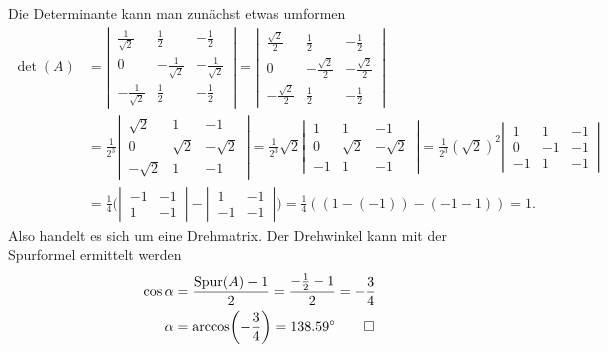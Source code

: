 \begin{loesung}
Die Determinante kann man zunächst etwas umformen
\begin{align*}
\det(A)
&=
\left|\,\begin{matrix}
\frac1{\sqrt{2}}&\frac12&-\frac12\\
0&-\frac1{\sqrt{2}}&-\frac1{\sqrt{2}}\\
-\frac1{\sqrt{2}}&\frac12&-\frac12
\end{matrix}\,\right|
=
\left|\,\begin{matrix}
\frac{\sqrt{2}}2&\frac12&-\frac12\\
0&-\frac{\sqrt{2}}2&-\frac{\sqrt{2}}2\\
-\frac{\sqrt{2}}2&\frac12&-\frac12
\end{matrix}\,\right|
\\
&=
\frac1{2^3}
\left|\,\begin{matrix}
\sqrt{2}&1&-1\\
0&\sqrt{2}&-\sqrt{2}\\
-\sqrt{2}&1&-1
\end{matrix}\,\right|
=
\frac1{2^3}\sqrt{2}
\left|\,\begin{matrix}
1&1&-1\\
0&\sqrt{2}&-\sqrt{2}\\
-1&1&-1
\end{matrix}\,\right|
=
\frac1{2^3}(\sqrt{2})^2
\left|\,\begin{matrix}
1&1&-1\\
0&-1&-1\\
-1&1&-1
\end{matrix}\,\right|
\\
&=
\frac14\biggl(
\left|\,\begin{matrix}
-1&-1\\1&-1
\end{matrix}\,\right|
-
\left|\,\begin{matrix}
1&-1\\
-1&-1
\end{matrix}\,\right|
\biggr)=\frac14((1-(-1))-(-1-1))=1.
\end{align*}
Also handelt es sich um eine Drehmatrix. Der Drehwinkel kann mit der
Spurformel ermittelt werden
\begin{align*}
\cos\alpha&=\frac{\operatorname{Spur}(A)-1}2=\frac{-\frac12-1}2=-\frac34
\\
\alpha&=\arccos\biggl(-\frac34\biggr)=138.59^\circ
\qedhere
\end{align*}
\end{loesung}

